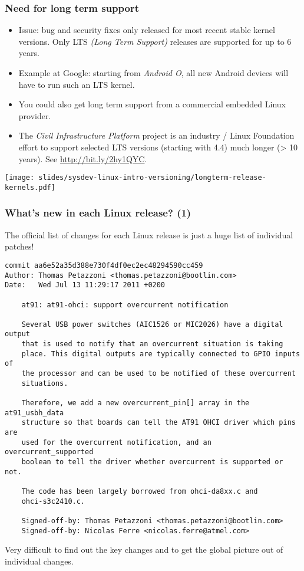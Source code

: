 \begin{frame}
  \frametitle{Need for long term support}
  \begin{itemize}
  \item Issue: bug and security fixes only released for most recent
    stable kernel versions. Only LTS {\em (Long Term Support)} releases
    are supported for up to 6 years.
  \item Example at Google: starting from {\em Android O}, all new Android devices will
    have to run such an LTS kernel.
  \item You could also get long term support from a commercial embedded
    Linux provider.
  \item The {\em Civil Infrastructure Platform} project is an industry /
    Linux Foundation effort to support selected LTS versions (starting
    with 4.4) much longer (> 10 years). See \url{http://bit.ly/2hy1QYC}.
  \end{itemize}
  \texttt{[image: slides/sysdev-linux-intro-versioning/longterm-release-kernels.pdf]}\\
\end{frame}

\begin{frame}[fragile]
  \frametitle{What's new in each Linux release? (1)}
  The official list of changes for each Linux release is just a
  huge list of individual patches!
\Tiny
    \begin{verbatim}
commit aa6e52a35d388e730f4df0ec2ec48294590cc459
Author: Thomas Petazzoni <thomas.petazzoni@bootlin.com>
Date:   Wed Jul 13 11:29:17 2011 +0200

    at91: at91-ohci: support overcurrent notification

    Several USB power switches (AIC1526 or MIC2026) have a digital output
    that is used to notify that an overcurrent situation is taking
    place. This digital outputs are typically connected to GPIO inputs of
    the processor and can be used to be notified of these overcurrent
    situations.

    Therefore, we add a new overcurrent_pin[] array in the at91_usbh_data
    structure so that boards can tell the AT91 OHCI driver which pins are
    used for the overcurrent notification, and an overcurrent_supported
    boolean to tell the driver whether overcurrent is supported or not.

    The code has been largely borrowed from ohci-da8xx.c and
    ohci-s3c2410.c.

    Signed-off-by: Thomas Petazzoni <thomas.petazzoni@bootlin.com>
    Signed-off-by: Nicolas Ferre <nicolas.ferre@atmel.com>
\end{verbatim}
\normalsize
  Very difficult to find out the key changes and to get the
  global picture out of individual changes.
\end{frame}

